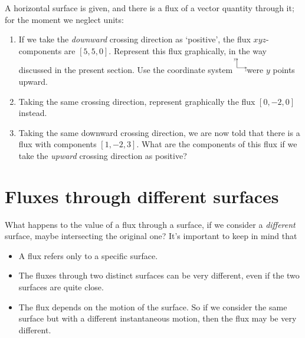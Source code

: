 \documentclass[a4paper,12pt,%
onecolumn,oneside,%
british%
]{memoir}
\renewcommand*{\|}[1][]{\nonscript\:#1\vert\nonscript\:\mathopen{}}
\begin{document}
\begin{exercise}
  A horizontal surface is given, and there is a flux of a vector quantity through it; for the moment we neglect units:
  \begin{enumerate}[label=\arabic*.]
  \item If we take the \emph{downward} crossing direction as \enquote*{positive}, the flux $xyz$-components are $[5,5,0]$. Represent this flux graphically, in the way discussed in the present section. Use the coordinate system\enskip\includegraphics[align=c,height=2em]{images/coords_xy.pdf}\enskip were $y$ points upward.
  \item Taking the same crossing direction, represent graphically the flux $[0,-2,0]$ instead.
  \item Taking the same downward crossing direction, we are now told that there is a flux with components $[1,-2,3]$. What are the components of this flux if we take the \emph{upward} crossing direction as positive?
  \end{enumerate}
\end{exercise}


\medskip


\section{Fluxes through different surfaces}
\label{sec:surface_change_scalar}

What happens to the value of a flux through a surface, if we consider a \emph{different} surface, maybe intersecting the original one? It's important to keep in mind that
\begin{itemize}[nosep]
\item A flux refers only to a specific surface.
\item The fluxes through two distinct surfaces can be very different, even if the two surfaces are quite close.
\item The flux depends on the motion of the surface. So if we consider the same surface but with a different instantaneous motion, then the flux may be very different.
\end{itemize}
\end{document}
